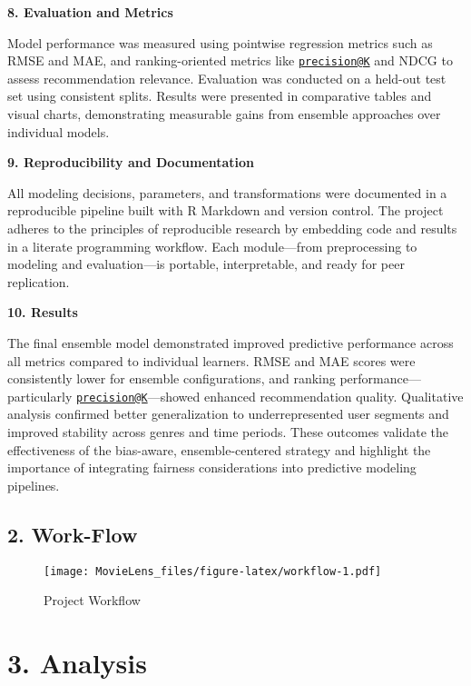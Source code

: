 \documentclass[
]{article}
\begin{document}
\textbf{8. Evaluation and Metrics}

Model performance was measured using pointwise regression metrics such
as RMSE and MAE, and ranking-oriented metrics like
\href{mailto:precision@K}{\nolinkurl{precision@K}} and NDCG to assess
recommendation relevance. Evaluation was conducted on a held-out test
set using consistent splits. Results were presented in comparative
tables and visual charts, demonstrating measurable gains from ensemble
approaches over individual models.

\textbf{9. Reproducibility and Documentation}

All modeling decisions, parameters, and transformations were documented
in a reproducible pipeline built with R Markdown and version control.
The project adheres to the principles of reproducible research by
embedding code and results in a literate programming workflow. Each
module---from preprocessing to modeling and evaluation---is portable,
interpretable, and ready for peer replication.

\textbf{10. Results}

The final ensemble model demonstrated improved predictive performance
across all metrics compared to individual learners. RMSE and MAE scores
were consistently lower for ensemble configurations, and ranking
performance---particularly
\href{mailto:precision@K}{\nolinkurl{precision@K}}---showed enhanced
recommendation quality. Qualitative analysis confirmed better
generalization to underrepresented user segments and improved stability
across genres and time periods. These outcomes validate the
effectiveness of the bias-aware, ensemble-centered strategy and
highlight the importance of integrating fairness considerations into
predictive modeling pipelines. \newpage

\subsection{2. Work-Flow}\label{work-flow}

\begin{figure}
\centering
\texttt{[image: MovieLens\_files/figure-latex/workflow-1.pdf]}
\caption{Project Workflow}
\end{figure}

\newpage

\section{3. Analysis}\label{analysis}
\end{document}
